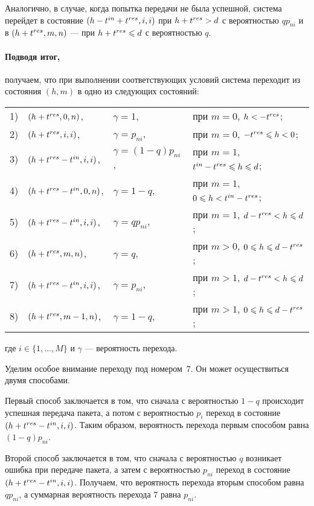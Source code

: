 Аналогично, в случае, когда попытка передачи не была успешной, система перейдет в состояние $(h - t^{in} + t^{res}, i, i)$ при  $h + t^{res} > d$ с вероятностью $q p_{ni}$ и в $(h + t^{res}, m, n)$ --- при $h + t^{res} \leqslant d$ с вероятностью $q$.

\paragraph{Подводя итог,} получаем, что при выполнении соответствующих условий система  переходит из состояния $(h, m)$ в одно из следующих состояний:

\begin{tabular}{l l l l}
1)	&$(h + t^{res}, 0, n)$, 			&$\gamma = 1$, 	&при $m = 0$, $h < -t^{res}$; \\
2)  &$(h + t^{res}, i, i)$, 			&$\gamma = p_{ni}$, &при $m = 0$, $-t^{res} \leqslant h < 0$; \\
3)  &$(h + t^{res} - t^{in}, i, i)$, 	&$\gamma = (1 - q)p_{ni}$, &при $m = 1$, $t^{in} - t^{res} \leqslant h \leqslant d$; \\
4)  &$(h + t^{res} - t^{in}, 0, n)$, 	&$\gamma = 1 - q$, &при $m = 1$, $0 \leqslant h < t^{in} - t^{res}$; \\
5)  &$(h + t^{res} - t^{in}, i, i)$, 	&$\gamma = q p_{ni}$, &при $m = 1$, $d - t^{res} < h \leqslant d$; \\
6)  &$(h + t^{res}, m, n)$, 			&$\gamma = q$, &при $m > 0$, $0 \leqslant h \leqslant d - t^{res}$; \\
7)  &$(h + t^{res} - t^{in}, i, i)$,	&$\gamma = p_{ni}$, &при $m > 1$, $d - t^{res} < h \leqslant d$; \\
8)  &$(h + t^{res}, m - 1, n)$, &$\gamma = 1 - q$, &при $m > 1$, $0 \leqslant h \leqslant d - t^{res}$;
\end{tabular} \newline
где $i\in\{1,\dots,M\}$ и $\gamma$ --- вероятность перехода. 

Уделим особое внимание переходу под номером~$7$. Он может осуществиться двумя способами. 

Первый способ заключается в том, что сначала с вероятностью $1 - q$ происходит успешная передача пакета, а потом с вероятностью $p_i$ переход в состояние $(h + t^{res} - t^{in}, i, i)$. Таким образом, вероятность перехода первым способом равна $(1 - q) p_{ni}$.

Второй способ заключается в том, что сначала с вероятностью $q$ возникает ошибка при передаче пакета, а затем с вероятностью $p_{ni}$ переход в состояние $(h + t^{res} - t^{in}, i, i)$. Получаем, что  вероятность перехода вторым способом равна $q p_{ni}$, а суммарная вероятность перехода $7$ равна $p_{ni}$. 

